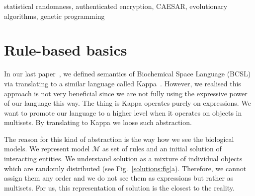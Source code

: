 \documentclass[12pt]{fithesis2}
\begin{document}
\begin{ThesisKeyWords}
statistical randomness, authenticated encryption, CAESAR, evolutionary algorithms, genetic programming
\end{ThesisKeyWords}

\MainMatter
\tableofcontents

\chapter{Rule-based basics}

In our last paper~\cite{Ded201627}, we defined semantics of Biochemical Space Language (BCSL) via translating to a similar language called Kappa~\cite{Kappa}. However, we realised this approach is not very beneficial since we are not fully using the expressive power of our language this way. The thing is Kappa operates purely on expressions. We want to promote our language to a higher level when it operates on objects in multisets. By translating to Kappa we loose such abstraction. 

The reason for this kind of abstraction is the way how we see the biological models. We represent model $\mathcal{M}$ as set of rules and an initial solution of interacting entities. We understand solution as a mixture of individual objects which are randomly distributed (see Fig.~\ref{solutions:fig}a). Therefore, we cannot assign them any order and we do not see them as expressions but rather as multisets. For us, this representation of solution is the closest to the reality.
\end{document}
